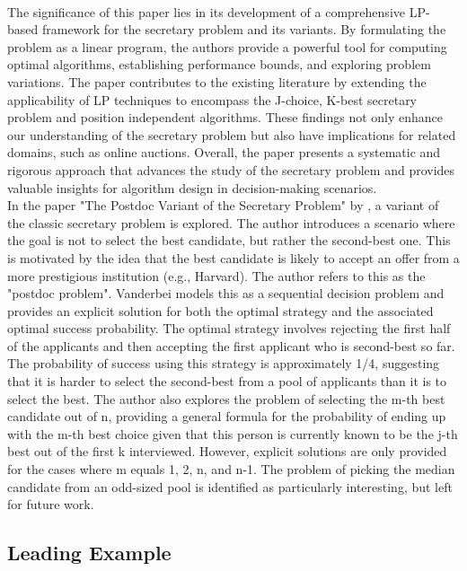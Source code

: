 \documentclass{article}
\begin{document}
\\[2ex]
The significance of this paper lies in its development of a comprehensive LP-based framework for the secretary problem and its variants. By formulating the problem as a linear program, the authors provide a powerful tool for computing optimal algorithms, establishing performance bounds, and exploring problem variations. The paper contributes to the existing literature by extending the applicability of LP techniques to encompass the J-choice, K-best secretary problem and position independent algorithms. These findings not only enhance our understanding of the secretary problem but also have implications for related domains, such as online auctions. Overall, the paper presents a systematic and rigorous approach that advances the study of the secretary problem and provides valuable insights for algorithm design in decision-making scenarios.
\\[2ex]
In the paper "The Postdoc Variant of the Secretary Problem" by \cite{vanderbei1983postdoc}, a variant of the classic secretary problem is explored. The author introduces a scenario where the goal is not to select the best candidate, but rather the second-best one. This is motivated by the idea that the best candidate is likely to accept an offer from a more prestigious institution (e.g., Harvard). The author refers to this as the "postdoc problem". Vanderbei models this as a sequential decision problem and provides an explicit solution for both the optimal strategy and the associated optimal success probability. The optimal strategy involves rejecting the first half of the applicants and then accepting the first applicant who is second-best so far. The probability of success using this strategy is approximately 1/4, suggesting that it is harder to select the second-best from a pool of applicants than it is to select the best. The author also explores the problem of selecting the m-th best candidate out of n, providing a general formula for the probability of ending up with the m-th best choice given that this person is currently known to be the j-th best out of the first k interviewed. However, explicit solutions are only provided for the cases where m equals 1, 2, n, and n-1. The problem of picking the median candidate from an odd-sized pool is identified as particularly interesting, but left for future work.

\subsection{Leading Example}
\end{document}
